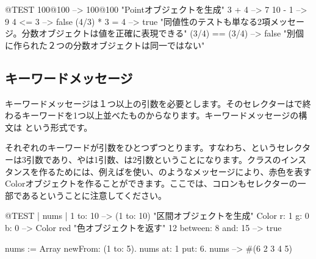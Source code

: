 \documentclass[a4paper,10pt,twoside]{book}
\begin{document}
\begin{code}{@TEST}
100@100      --> 100@100  "Pointオブジェクトを生成"
3 + 4              --> 7
10 - 1            --> 9
4 <= 3            --> false
(4/3) * 3 = 4   --> true  "同値性のテストも単なる2項メッセージ。分数オブジェクトは値を正確に表現できる"
(3/4) == (3/4) --> false  "別個に作られた２つの分数オブジェクトは同一ではない"
\end{code}


\subsection{キーワードメッセージ} 

キーワードメッセージは１つ以上の引数を必要とします。そのセレクターは\ct{:}で終わるキーワードを1つ以上並べたものからなります。キーワードメッセージの構文は
という形式です。

それぞれのキーワードが引数をひとつずつとります。すなわち、というセレクターは3引数であり、やは1引数、は2引数ということになります。クラスのインスタンスを作るためには、例えばを使い、のようなメッセージにより、赤色を表すColorオブジェクトを作ることができます。ここでは、コロンもセレクターの一部であるということに注意してください。


\begin{code}{@TEST | nums |}
1 to: 10                        --> (1 to: 10)  "区間オブジェクトを生成"
Color r: 1 g: 0 b: 0       --> Color red  "色オブジェクトを返す"
12 between: 8 and: 15 --> true

nums := Array newFrom: (1 to: 5).
nums at: 1 put: 6.
nums --> #(6 2 3 4 5)
\end{code}
\end{document}
